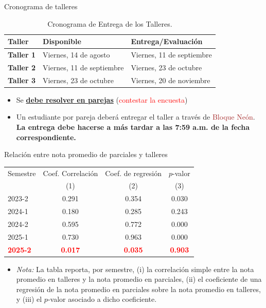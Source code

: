 \documentclass[10pt, xcolor=dvipsnames]{beamer}
\begin{document}
\begin{frame}{Cronograma de talleres}
    \begin{center}
    \begin{longtable}{|l|l|l|}
    \caption{Cronograma de Entrega de los Talleres.}\label{TAB:Cronograma} \\    
    \hline 
    \textbf{Taller}   & \textbf{Disponible}         & \textbf{Entrega/Evaluación} \\ \hline
    \textbf{Taller 1} & Viernes, 14 de agosto       & Viernes, 11 de septiembre \\ \hline
    \textbf{Taller 2} & Viernes, 11 de septiembre   & Viernes, 23 de octubre \\ \hline
    \textbf{Taller 3} & Viernes, 23 de octubre      & Viernes, 20 de noviembre \\ \hline 
    \end{longtable}
    \end{center}
\vspace{-2em}
\begin{itemize}
\pause
    \item Se \underline{\textbf{debe resolver en parejas}} (\textcolor{red}{contestar la encuesta})
    \item Un estudiante por pareja deberá entregar el taller a través de \textcolor{brown}{Bloque Neón}. \textbf{La entrega debe hacerse a más tardar a las 7:59 a.m. de la fecha correspondiente.}
\end{itemize}
\end{frame}


\begin{frame}{Relación entre nota promedio de parciales y talleres}
    \begin{table}[htbp]\centering
\label{tab:talleres_parciales}
\begin{tabular}{lccc}
\toprule
Semestre & Coef. Correlación & Coef. de regresión & $p$-valor \\
& (1) & (2) & (3) \\
\midrule
2023-2 & 0.291 & 0.354 & 0.030 \\
2024-1 & 0.180 & 0.285 & 0.243 \\
2024-2 & 0.595 & 0.772 & 0.000 \\
2025-1 & 0.730 & 0.963 & 0.000 \\
\textcolor{red}{\textbf{2025-2}} & \textcolor{red}{\textbf{0.017}} & \textcolor{red}{\textbf{0.035}} & \textcolor{red}{\textbf{0.903}} \\
\bottomrule
\end{tabular}
\end{table}
\begin{itemize}
    \item \textit{Nota:} La tabla reporta, por semestre, (i) la correlación simple entre la nota promedio en talleres y la nota promedio en parciales, (ii) el coeficiente de una regresión de la nota promedio en parciales sobre la nota promedio en talleres, y (iii) el $p$-valor asociado a dicho coeficiente.
\end{itemize}
\end{frame}
\end{document}

